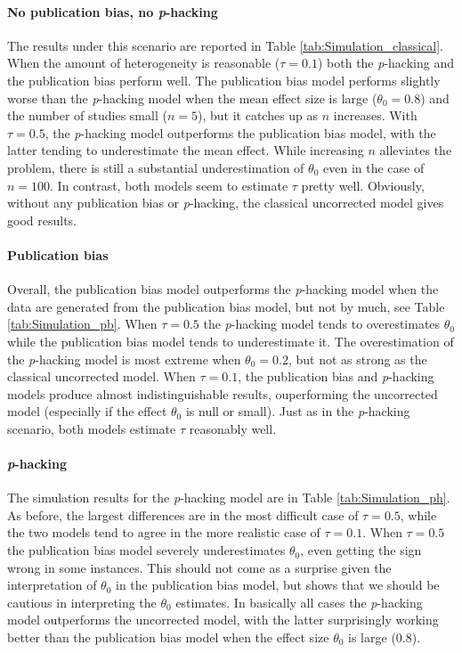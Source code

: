 \documentclass[useAMS,usenatbib,referee]{biom}
\begin{document}
\paragraph{No publication bias, no \textit{p}-hacking} The results under this scenario are reported in Table \ref{tab:Simulation_classical}. When the amount of heterogeneity is reasonable ($\tau = 0.1$) both the \textit{p}-hacking and the publication bias perform well. The publication bias model performs slightly worse than the \textit{p}-hacking model when the mean effect size is large ($\theta_0 = 0.8$) and the number of studies small ($n=5$), but it catches up as $n$ increases. With $\tau = 0.5$, the \textit{p}-hacking model outperforms the publication bias model, with the latter tending to underestimate the mean effect. While increasing $n$ alleviates the problem, there is still a substantial underestimation of $\theta_0$ even in the case of $n = 100$. In contrast, both models seem to estimate $\tau$ pretty well. Obviously, without any publication bias or \textit{p}-hacking, the classical uncorrected model gives good results.




\paragraph{Publication bias} Overall, the publication bias model outperforms the \textit{p}-hacking model when the data are generated from the publication bias model, but not by much, see Table \ref{tab:Simulation_pb}. When $\tau = 0.5$ the \textit{p}-hacking model tends to overestimates $\theta_0$ while the publication bias model tends to underestimate it. The overestimation of the \textit{p}-hacking model is most extreme when $\theta_0 = 0.2$, but not as strong as the classical uncorrected model. When $\tau = 0.1$, the publication bias and \textit{p}-hacking models produce almost indistinguishable results, ouperforming the uncorrected model (especially if the effect $\theta_0$ is null or small). Just as in the \textit{p}-hacking scenario, both models estimate $\tau$ reasonably well.




\paragraph{\textit{p}-hacking} The simulation results for the \textit{p}-hacking model are in Table \ref{tab:Simulation_ph}. As before, the largest differences are in the most difficult case of $\tau = 0.5$, while the two models tend to agree in the more realistic case of $\tau = 0.1$. When $\tau = 0.5$ the publication bias model severely underestimates $\theta_0$, even getting the sign wrong in some instances. This should not come as a surprise given the interpretation of $\theta_0$ in the publication bias model, but shows that we should be cautious in interpreting the $\theta_0$ estimates. In basically all cases the \textit{p}-hacking model outperforms the uncorrected model, with the latter surprisingly working better than the publication bias model when the effect size $\theta_0$ is large (0.8).
\end{document}
